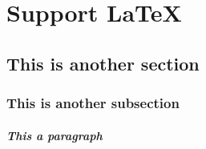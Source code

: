 
\chapter{Support \LaTeX}
\lipsum

\section{This is another section}
\lipsum

\subsection{This is another subsection}
\lipsum

\paragraph{This a paragraph}
\lipsum
